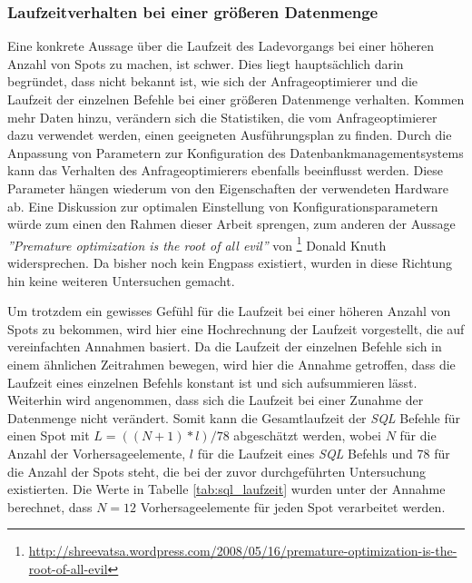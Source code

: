 \subsubsection{Laufzeitverhalten bei einer größeren Datenmenge}
Eine konkrete Aussage über die Laufzeit des Ladevorgangs bei einer
höheren Anzahl von Spots zu machen, ist schwer. Dies liegt
hauptsächlich darin begründet, dass nicht bekannt ist, wie sich der
Anfrageoptimierer und die Laufzeit der einzelnen Befehle bei einer
größeren Datenmenge verhalten. Kommen mehr Daten hinzu, verändern sich
die Statistiken, die vom Anfrageoptimierer dazu verwendet werden,
einen geeigneten Ausführungsplan zu finden. Durch die Anpassung von
Parametern zur Konfiguration des Datenbankmanagementsystems kann das
Verhalten des Anfrageoptimierers ebenfalls beeinflusst werden. Diese
Parameter hängen wiederum von den Eigenschaften der verwendeten
Hardware ab. Eine Diskussion zur optimalen Einstellung von
Konfigurationsparametern würde zum einen den Rahmen dieser Arbeit
sprengen, zum anderen der Aussage \textit{''Premature optimization is
  the root of all evil''} von
\footnote{\url{http://shreevatsa.wordpress.com/2008/05/16/premature-optimization-is-the-root-of-all-evil}}
Donald Knuth widersprechen. Da bisher noch kein Engpass existiert,
wurden in diese Richtung hin keine weiteren Untersuchen gemacht.

Um trotzdem ein gewisses Gefühl für die Laufzeit bei einer höheren
Anzahl von Spots zu bekommen, wird hier eine Hochrechnung der Laufzeit
vorgestellt, die auf vereinfachten Annahmen basiert. Da die Laufzeit
der einzelnen Befehle sich in einem ähnlichen Zeitrahmen bewegen, wird
hier die Annahme getroffen, dass die Laufzeit eines einzelnen Befehls
konstant ist und sich aufsummieren lässt. Weiterhin wird angenommen,
dass sich die Laufzeit bei einer Zunahme der Datenmenge nicht
verändert. Somit kann die Gesamtlaufzeit der \textit{SQL} Befehle für
einen Spot mit $L = ((N+1) * l) / 78$ abgeschätzt werden, wobei $N$
für die Anzahl der Vorhersageelemente, $l$ für die Laufzeit eines
\textit{SQL} Befehls und 78 für die Anzahl der Spots steht, die bei
der zuvor durchgeführten Untersuchung existierten. Die Werte in
Tabelle \ref{tab:sql_laufzeit} wurden unter der Annahme berechnet,
dass $N=12$ Vorhersageelemente für jeden Spot verarbeitet werden.

